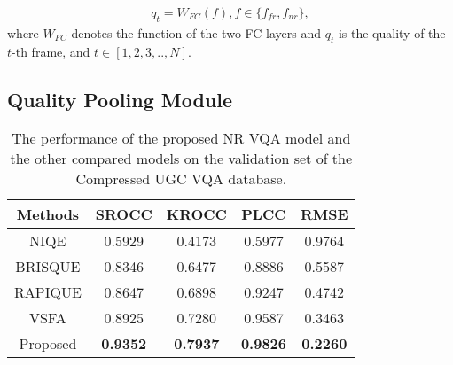 \documentclass{article}
\begin{document}
\begin{equation}
\begin{array}{c}
q_t = W_{FC}(f), f \in \{f_{fr}, f_{nr}\},
\end{array}
\end{equation}
where $ W_{FC} $ denotes the function of the two FC layers and $q_t$ is the quality of the $t$-th frame, and $t \in [1,2,3,..,N]$.

\subsection{Quality Pooling Module}

\begin{table}
	\small
\centering
	\renewcommand{\arraystretch}{1.15}
	\caption{The performance of the proposed NR VQA model and the other compared models on the validation set of the Compressed UGC VQA database.}
	\label{NR_Compressed}
\begin{tabular}{c|cccc}
		\toprule[.15em]
		
		Methods & SROCC & KROCC & PLCC & RMSE   \\
		\hline
		NIQE \cite{mittal2012making}     &0.5929  &0.4173  & 0.5977  &0.9764 \\
		
		BRISQUE \cite{mittal2012no}  &0.8346  &0.6477  &0.8886 &0.5587 \\
		
		RAPIQUE \cite{tu2021rapique}  &0.8647  &0.6898  &0.9247&0.4742 \\
		
		VSFA \cite{li2019quality} &0.8925  &0.7280  &0.9587 &0.3463   \\
		
		Proposed    & \textbf{0.9352} 	&\textbf{ 0.7937} 	&\textbf{0.9826} 	&\textbf{0.2260} \\
		
		\bottomrule[.15em]
		
	\end{tabular}	


\end{table}
\end{document}
